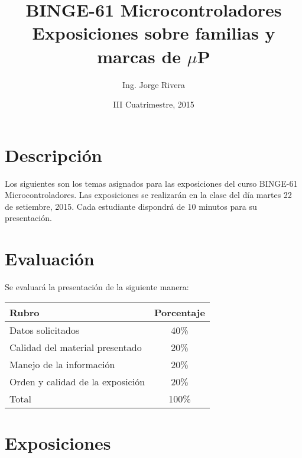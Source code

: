\documentclass[letterpaper,10pt]{article}
\title{BINGE-61 Microcontroladores\\ Exposiciones sobre familias y marcas de $\mu$P}
\author{Ing. Jorge Rivera}
\date{III Cuatrimestre, 2015}
\begin{document}
\maketitle

\section{Descripción}

Los siguientes son los temas asignados para las exposiciones del curso BINGE-61 Microcontroladores. Las exposiciones se realizarán en la clase del día martes 22 de setiembre, 2015. Cada estudiante dispondrá de 10 minutos para su presentación.

\section{Evaluación}

Se evaluará la presentación de la siguiente manera:

\begin{center}
	\begin{tabular}{|l|c|}
	\hline
	Rubro							& Porcentaje \\ \hline\hline
	Datos solicitados 				& 40\% \\ \hline
	Calidad del material presentado & 20\% \\ \hline
	Manejo de la información		& 20\% \\ \hline
	Orden y calidad de la exposición & 20\% \\ \hline\hline
	Total							& 100\% \\ \hline
\end{tabular} 
\end{center}


\section{Exposiciones}
\end{document}
